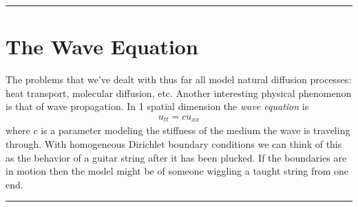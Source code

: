 \documentclass[
]{book}
\theoremstyle{definition}
\theoremstyle{definition}
\theoremstyle{definition}
\theoremstyle{remark}
\begin{document}
\begin{center}\rule{0.5\linewidth}{0.5pt}\end{center}

\hypertarget{the-wave-equation}{%
\section{The Wave Equation}\label{the-wave-equation}}

The problems that we've dealt with thus far all model natural diffusion processes: heat transport, molecular diffusion, etc. Another interesting physical phenomenon is that of wave propagation. In 1 spatial dimension the \emph{wave equation} is \[\begin{aligned}
       u_{tt} = c u_{xx}
       \label{eqn:wave1D}
   \end{aligned}\]
where \(c\) is a parameter modeling the stiffness of the medium the wave is traveling through. With homogeneous Dirichlet boundary conditions we can think of this as the behavior of a guitar string after it has been plucked. If the boundaries are in motion then the model might be of someone wiggling a taught string from one end.

\begin{center}\rule{0.5\linewidth}{0.5pt}\end{center}
\end{document}
